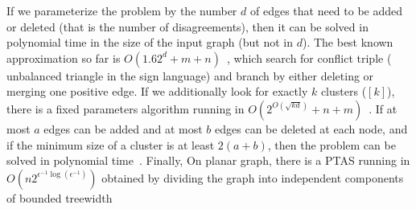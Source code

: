 If we parameterize the problem by the number $d$ of edges that need to be added or deleted (that is
the number of disagreements), then it can be solved in polynomial time in the size of the input
graph (but not in $d$). The best known approximation so far is
$O(1.62^d+m+n)$~\autocite{GoldenCE12}, which search for conflict triple (\ie{} unbalanced triangle
in the sign language) and branch by either deleting or merging one positive edge. If we additionally
look for exactly $k$ clusters (\ie \mind$[k]$), there is a fixed parameters algorithm running in
$O(2^{O(\sqrt{kd})}+n+m)$~\autocite{Fomin2014}. If at most $a$ edges can be added and at most $b$
edges can be deleted at each node, and if the minimum size of a cluster is at least $2(a+b)$, then
the problem can be solved in polynomial time~\autocite{Abu-Khzam2015}. Finally, On planar graph,
there is a PTAS running in $O(n2^{\epsilon^{-1}\log(\epsilon^{-1})})$ obtained by dividing the graph
into independent components of bounded treewidth~\autocite{PlanarCEPTAS17}
